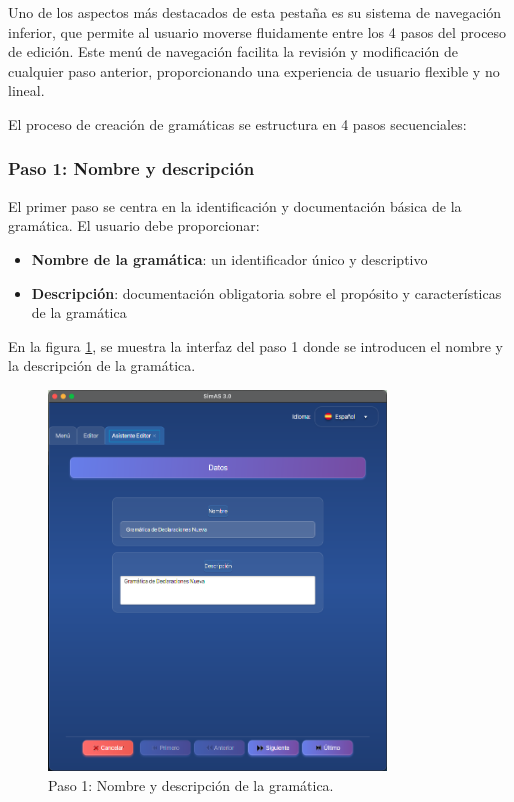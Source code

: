 Uno de los aspectos más destacados de esta pestaña es su sistema de navegación inferior, que permite al usuario moverse fluidamente entre los 4 pasos del proceso de edición. Este menú de navegación facilita la revisión y modificación de cualquier paso anterior, proporcionando una experiencia de usuario flexible y no lineal.

El proceso de creación de gramáticas se estructura en 4 pasos secuenciales:

\subsubsection{Paso 1: Nombre y descripción}

El primer paso se centra en la identificación y documentación básica de la gramática. El usuario debe proporcionar:
\begin{itemize}
 \item \textbf{Nombre de la gramática}: un identificador único y descriptivo
 \item \textbf{Descripción}: documentación obligatoria sobre el propósito y características de la gramática
\end{itemize}

En la figura \ref{fig:paso1}, se muestra la interfaz del paso 1 donde se introducen el nombre y la descripción de la gramática.

\needspace{6cm}
\begin{figure}[H]
\centering
\includegraphics[width=0.8\textwidth]{figuras2/editor/paso1_datos.png}
\caption{Paso 1: Nombre y descripción de la gramática.}
\label{fig:paso1}
\end{figure}


